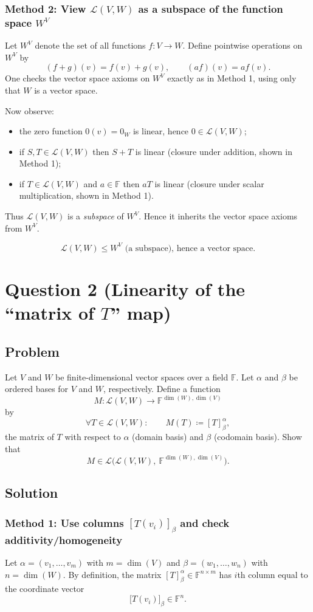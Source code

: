 \documentclass[12pt]{article}
\newcommand{\F}{\mathbb{F}}
\newcommand{\cL}{\mathcal{L}}
\begin{document}
\subsubsection{Method 2: View $\cL(V,W)$ as a subspace of the function space $W^V$}
Let $W^V$ denote the set of all functions $f:V\to W$. Define pointwise operations on $W^V$ by
\[
(f+g)(v)=f(v)+g(v),\qquad (af)(v)=a f(v).
\]
One checks the vector space axioms on $W^V$ exactly as in Method 1, using only that $W$ is a vector space.

Now observe:
\begin{itemize}[leftmargin=*]
\item the zero function $0(v)=0_W$ is linear, hence $0\in\cL(V,W)$;
\item if $S,T\in\cL(V,W)$ then $S+T$ is linear (closure under addition, shown in Method 1);
\item if $T\in\cL(V,W)$ and $a\in\F$ then $aT$ is linear (closure under scalar multiplication, shown in Method 1).
\end{itemize}
Thus $\cL(V,W)$ is a \emph{subspace} of $W^V$. Hence it inherits the vector space axioms from $W^V$.

\[
\boxed{\,\cL(V,W)\le W^V\text{ (a subspace), hence a vector space.}\,}
\]

\newpage
\section{Question 2 (Linearity of the ``matrix of $T$'' map)}
\subsection{Problem}
Let $V$ and $W$ be finite-dimensional vector spaces over a field $\F$.
Let $\alpha$ and $\beta$ be ordered bases for $V$ and $W$, respectively.
Define a function
\[
M:\cL(V,W)\to \F^{\dim(W),\dim(V)}
\]
by
\[
\forall T\in\cL(V,W):\qquad M(T)\coloneqq [T]_{\beta}^{\alpha},
\]
the matrix of $T$ with respect to $\alpha$ (domain basis) and $\beta$ (codomain basis).
Show that
\[
M\in \cL\bigl(\cL(V,W),\ \F^{\dim(W),\dim(V)}\bigr).
\]

\subsection{Solution}

\subsubsection{Method 1: Use columns $[T(v_i)]_\beta$ and check additivity/homogeneity}
Let $\alpha=(v_1,\dots,v_m)$ with $m=\dim(V)$ and $\beta=(w_1,\dots,w_n)$ with $n=\dim(W)$.
By definition, the matrix $[T]_\beta^\alpha\in \F^{n\times m}$ has $i$th column equal to the coordinate vector
\[
\bigl[T(v_i)\bigr]_\beta \in \F^n.
\]
\end{document}
